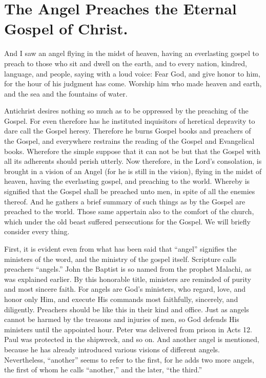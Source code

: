 \chapter[Sermon 63. The Angel Preaches the Eternal Gospel of Christ.]{The Angel Preaches the Eternal Gospel of Christ.}
\label{sermon:063}

And I saw an angel flying in the midst of heaven, having an everlasting gospel to preach to those who sit and dwell on the earth, and to every nation, kindred, language, and people, saying with a loud voice: Fear God, and give honor to him, for the hour of his judgment has come. Worship him who made heaven and earth, and the sea and the fountains of water.

Antichrist desires nothing so much as to be oppressed by the preaching of the Gospel. For even therefore has he instituted inquisitors of heretical depravity to dare call the Gospel heresy. Therefore he burns Gospel books and preachers of the Gospel, and everywhere restrains the reading of the Gospel and Evangelical books. Wherefore the simple suppose that it can not be but that the Gospel with all its adherents should perish utterly. Now therefore, in the Lord’s consolation, is brought in a vision of an Angel (for he is still in the vision), flying in the midst of heaven, having the everlasting gospel, and preaching to the world. Whereby is signified that the Gospel shall be preached unto men, in spite of all the enemies thereof. And he gathers a brief summary of such things as by the Gospel are preached to the world. Those same appertain also to the comfort of the church, which under the old beast suffered persecutions for the Gospel. We will briefly consider every thing.

First, it is evident even from what has been said that “angel” signifies the ministers of the word, and the ministry of the gospel itself. Scripture calls preachers “angels.” John the Baptist is so named from the prophet Malachi, as was explained earlier. By this honorable title, ministers are reminded of purity and most sincere faith. For angels are God’s ministers, who regard, love, and honor only Him, and execute His commands most faithfully, sincerely, and diligently. Preachers should be like this in their kind and office. Just as angels cannot be harmed by the treasons and injuries of men, so God defends His ministers until the appointed hour. Peter was delivered from prison in Acts 12. Paul was protected in the shipwreck, and so on. And another angel is mentioned, because he has already introduced various visions of different angels. Nevertheless, “another” seems to refer to the first, for he adds two more angels, the first of whom he calls “another,” and the later, “the third.”

